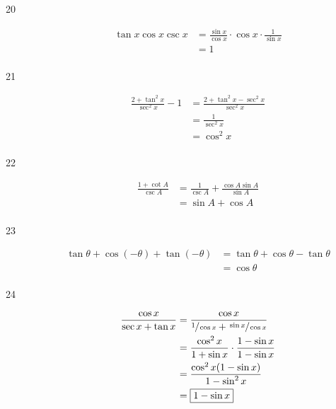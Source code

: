 \documentclass{exam}
\begin{document}
\begin{description}
      \item[20] 
        \begin{align*}
          \tan x \cos x \csc x & = \frac{\sin x}{\cos x} \cdot \cos x \cdot \frac{1}{\sin x} \\
                               & = \boxed{ 1 } \\
        \end{align*}

      \item[21] 
        \begin{align*}
          \frac{2 + \tan^2 x}{\sec^2 x} - 1 & = \frac{2 + \tan^2 x - \sec^2 x}{\sec^2 x} \\
                                            & = \frac{1}{\sec^2 x} \\
                                            & = \boxed{ \cos^2 x } \\
        \end{align*}

      \item[22] 
        \begin{align*}
          \frac{1 + \cot A}{\csc A} & = \frac{1}{\csc A} + \frac{\cos A \sin A}{\sin A} \\
                                    & = \boxed{ \sin A + \cos A } \\
        \end{align*}

      \item[23] 
        \begin{align*}
          \tan \theta + \cos(- \theta) + \tan(- \theta) & = \tan \theta + \cos \theta - \tan \theta \\
                                                        & = \boxed{ \cos \theta } \\
        \end{align*}

      \item[24] 
        \begin{align*}
          \frac{\cos x}{\sec x + \tan x} & = \frac{\cos x}{\sfrac{1}{\cos x} + \sfrac{\sin x}{\cos x}} \\
                                         & = \frac{\cos^2 x}{1 + \sin x} \cdot \frac{1 - \sin x}{1 - \sin x} \\
                                         & = \frac{\cos^2 x (1 - \sin x)}{1 - \sin^2 x} \\
                                         & = \boxed{ 1 - \sin x } \\
        \end{align*}



\end{description}
\end{document}
